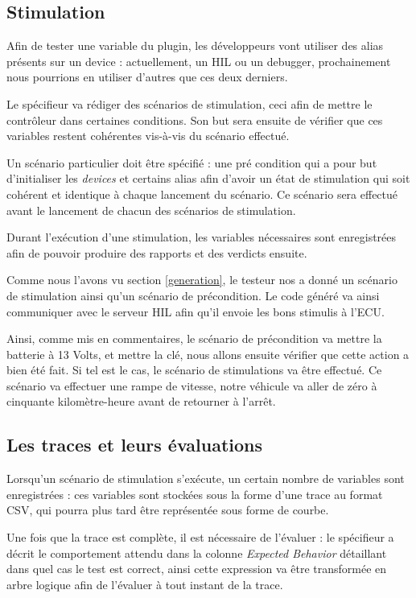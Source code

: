 \subsection{Stimulation} \label{stim}
Afin de tester une variable du plugin, les développeurs vont utiliser des alias présents sur un device : actuellement, un HIL ou un debugger, prochainement nous pourrions en utiliser d'autres que ces deux derniers.

Le spécifieur va rédiger des scénarios de stimulation, ceci afin de mettre le contrôleur dans certaines conditions. Son but sera ensuite de vérifier que ces variables restent cohérentes vis-à-vis du scénario effectué. 

Un scénario particulier doit être spécifié : une pré condition qui a pour but d'initialiser les \textit{devices} et certains alias afin d'avoir un état de stimulation qui soit cohérent et identique à chaque lancement du scénario. Ce scénario sera effectué avant le lancement de chacun des scénarios de stimulation.

Durant l'exécution d'une stimulation, les variables nécessaires sont enregistrées afin de pouvoir produire des rapports et des
verdicts ensuite.
\begin{exemple}
	Comme nous l'avons vu section \ref{generation}, le testeur nos a donné un scénario de stimulation ainsi qu'un scénario de précondition. Le code généré va ainsi communiquer avec le serveur HIL afin qu'il envoie les bons stimulis à l'ECU.

	Ainsi, comme mis en commentaires, le scénario de précondition va mettre la batterie à 13 Volts, et mettre la clé, nous allons ensuite vérifier que cette action a bien été fait. Si tel est le cas, le scénario de stimulations va être effectué. Ce scénario va effectuer une rampe de vitesse, notre véhicule va aller de zéro à cinquante kilomètre-heure avant de retourner à l'arrêt.	
\end{exemple}

\subsection{Les traces et leurs évaluations}\label{expectedBehavior}
Lorsqu'un scénario de stimulation s'exécute, un certain nombre de variables sont enregistrées : ces variables sont stockées sous la forme d'une trace au format CSV, qui pourra plus tard être représentée sous forme de courbe. 

Une fois que la trace est complète, il est nécessaire de l'évaluer : le spécifieur a décrit le comportement attendu dans la colonne \textit{Expected Behavior} détaillant dans quel cas le test est correct, ainsi cette expression va être transformée en arbre logique afin de l'évaluer à tout instant de la trace. 

